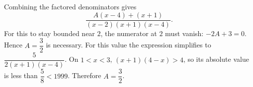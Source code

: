 Combining the factored denominators gives
\[
\dfrac{A(x-4)+(x+1)}{(x-2)(x+1)(x-4)}.
\]
For this to stay bounded near $2$, the numerator at $2$ must vanish: $-2A+3=0$. Hence $A=\dfrac{3}{2}$ is necessary. For this value the expression simplifies to $\dfrac{5}{2(x+1)(x-4)}$. On $1<x<3$, $(x+1)(4-x)>4$, so its absolute value is less than $\dfrac{5}{8}<1999$. Therefore $\boxed{A=\dfrac{3}{2}}$.
